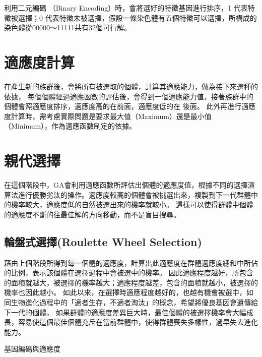 利用二元編碼 （Binary Encoding）時，會將選好的特徵基因進行排序，1 代表特徵被選擇；0 代表特徵未被選擇，假設一條染色體有五個特徵可以選擇，所構成的染色體從00000～11111共有32個可行解。

\section{適應度計算}


在產生新的族群後，會將所有被選取的個體，計算其適應能力，做為接下來選種的依據， 每個個體經過適應函數的評估後，會得到一個適應能力值，接著族群中的個體會照適應度排序，適應度高的在前面，適應度低的在 後面。
此外再進行適應度計算時，需考慮實際問題是要求最大值（Maximum）還是最小值（Minimum），作為適應函數制定的依據。

\section{親代選擇}
在這個階段中，GA會利用適應函數所評估出個體的適應度值，根據不同的選擇演算法進行優勝劣汰的操作。適應度較高的個體會被挑選出來，複製到下一代群體中的機率較大，適應度低的自然被選出來的機率就較小。 這樣可以使得群體中個體的適應度不斷的往最佳解的方向移動，而不是盲目搜尋。

\subsection{輪盤式選擇(Roulette Wheel Selection)}

藉由上個階段所得到每一個體的適應度，計算出此適應度在群體適應度總和中所佔的比例，表示該個體在選擇過程中會被選中的機率。
因此適應程度越好，所包含的面積就越大，被選擇的機率越大；適應程度越差，包含的面積就越小，被選擇的機率也因此越小。
如此以來，在選擇時適應程度越好的，也越有機會被選中，如同生物進化過程中的「適者生存，不適者淘汰」的概念，希望將優良基因會遺傳給下一代的個體。
如果群體的適應度差異巨大時，最佳個體的被選擇機率會大幅成長，容易使這個最佳個體充斥在當前群體中，使得群體喪失多樣性，過早失去進化能力。

\begin{table}[h!]
	\centering
	\label{tab:GeneEncodeAndFitness}
	
	\caption{基因編碼與適應度}
\end{table}

